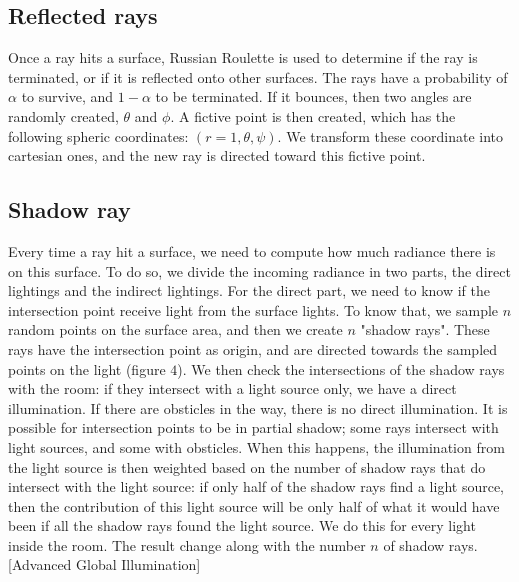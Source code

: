 \documentclass[12pt]{article}
\numberwithin{equation}{section}
\begin{document}
\subsection{Reflected rays}
Once a ray hits a surface, Russian Roulette is used to determine if the ray is terminated, or if it is reflected onto other surfaces. The rays have a probability of $\alpha$ to survive, and $1-\alpha$ to be terminated. If it bounces, then two angles are randomly created, $\theta$ and $\phi$. A fictive point is then created, which has the following spheric coordinates: $(r=1, \theta, \psi)$. We transform these coordinate into cartesian ones, and the new ray is directed toward this fictive point.

\subsection{Shadow ray}

Every time a ray hit a surface, we need to compute how much radiance there is on this surface. To do so, we divide the incoming radiance in two parts, the direct lightings and the indirect lightings. For the direct part, we need to know if the intersection point receive light from the surface lights. To know that, we sample $n$ random points on the surface area, and then we create $n$ "shadow rays". These rays have the intersection point as origin, and are directed towards the sampled points on the light (figure $4$). We then check the intersections of the shadow rays with the room: if they intersect with a light source only, we have a direct illumination. If there are obsticles in the way, there is no direct illumination. It is possible for intersection points to be in partial shadow; some rays intersect with light sources, and some with obsticles. When this happens, the illumination from the light source is then weighted based on the number of shadow rays that do intersect with the light source: if only half of the shadow rays find a light source, then the contribution of this light source will be only half of what it would have been if all the shadow rays found the light source. We do this for every light inside the room. The result change along with the number $n$ of shadow rays. [Advanced Global Illumination]
\end{document}
